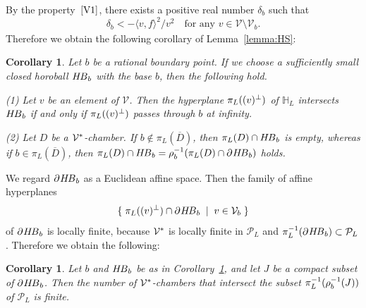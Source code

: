 \documentclass{amsart}
\theoremstyle{plain}
\newtheorem{corollary}[theorem]{Corollary}
\theoremstyle{definition}
\theoremstyle{remark}
\numberwithin{equation}{section}
\numberwithin{table}{section}
\numberwithin{figure}{section}
\renewcommand{\H}{\mathord{\mathbb H}}
\newcommand{\PPP}{\mathord{\mathcal P}}
\newcommand{\VVV}{\mathord{\mathcal V}}
\newcommand{\set}[2]{\{\; {#1} \; \mid \; {#2} \;  \}}
\newcommand{\inv}{\sp{-1}}
\newcommand{\sperp}{\sp{\perp}}
\newcommand{\bdr}{\partial\,}
\newcommand{\closure}[1]{\overline{#1}}
\newcommand{\intM}[2]{\langle{#1}\rangle_{#2}}
\newcommand{\sphyp}{\sp*}
\newcommand{\HB}{\mathord{H\hskip -1pt B}}
\newcommand{\bdrHB}{\mathord{\bdr \hskip -1.2pt H\hskip -1.2pt B}}
\newcommand{\propVone}{\mathord{\rm [V1]}}
\begin{document}
By the property~$\propVone$, there exists a positive real number $\delta_{b}$ such that
$$
\delta_{b}< -\intM{v,f}{}^2/v^2\quad \textrm{for any $v\in \VVV\setminus \VVV_b$}.
$$
Therefore we obtain the following corollary of Lemma~\ref{lemma:HS}:
%
\begin{corollary}\label{cor:HS}
Let $b$ be a rational boundary point.
If we choose a sufficiently small closed horoball  $\HB_b$
with the base $b$, then the following hold.
\par
{\rm (1)} 
Let $v$ be an element of $\VVV$.
Then the hyperplane $\pi_L((v)\sperp)$ of $\H_L$ intersects $\HB_b$
if and only if
$\pi_L((v)\sperp)$ passes through $b$ at infinity.
\par
{\rm (2)} 
Let  $D$ be a $\VVV\sphyp$-chamber.
If $b\notin \pi_L(\closure{D})$,
then $\pi_L(D)\cap\HB_b$ is empty,
whereas  %
if $b\in \pi_L(\closure{D})$,
then $\pi_L(D)\cap\HB_b=\rho_b\inv(\pi_L(D)\cap\bdrHB_b )$ holds.
\end{corollary}
%
We regard $\bdrHB_b$ as a Euclidean affine space.
Then the family of affine hyperplanes
$$
\set{\pi_L((v)\sperp)\cap \bdrHB_b }{v\in \VVV_b}
$$
of $\bdrHB_b $ is locally finite,
because $\VVV\sphyp$ is locally finite in $\PPP_L$ and $\pi_L\inv(\bdrHB_b )\subset\PPP_L$.
Therefore we obtain the following:
%
\begin{corollary}\label{cor:J}
Let $b$ and $\HB_b$ be as in Corollary~\ref{cor:HS},
 and let $J$ be a compact subset of $\bdrHB_b $.
Then the  number of $\VVV\sphyp$-chambers 
that intersect the subset $\pi_L\inv (\rho_b\inv (J))$ of $\PPP_L$
is finite.
\end{corollary}
%
%
\end{document}

